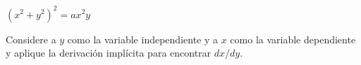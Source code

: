 \item $(x^2 + y^2)^2 = ax^2y$
\par
Considere a $y$ como la variable independiente y a $x$ como la variable dependiente y aplique la derivación implícita para encontrar $dx/dy$.
